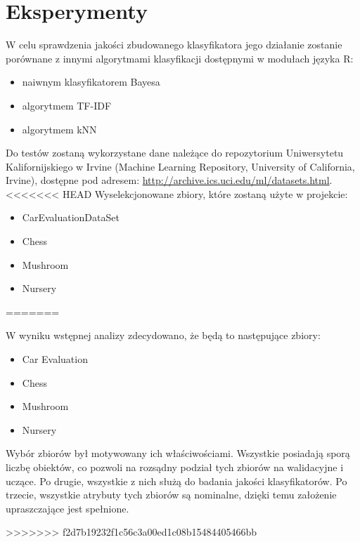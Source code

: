 \documentclass[paper=a4, fontsize=11pt]{scrartcl} %
\numberwithin{equation}{section} %
\numberwithin{figure}{section} %
\numberwithin{table}{section} %
\begin{document}
\section{Eksperymenty}   
W celu sprawdzenia jakości zbudowanego klasyfikatora jego działanie zostanie porównane z innymi algorytmami klasyfikacji dostępnymi w modułach języka R: \\
\begin{itemize}
\item naiwnym klasyfikatorem Bayesa
\item algorytmem TF-IDF
\item algorytmem kNN
\end{itemize}
Do testów zostaną wykorzystane dane należące do repozytorium Uniwersytetu Kalifornijskiego w Irvine (Machine Learning Repository, University of California, Irvine), dostępne pod adresem: \url{http://archive.ics.uci.edu/ml/datasets.html}.
<<<<<<< HEAD
Wyselekcjonowane zbiory, które zostaną użyte w projekcie:
\begin{itemize}
\item CarEvaluationDataSet
\item Chess
\item Mushroom
\item Nursery
\end{itemize}
=======

W wyniku wstępnej analizy zdecydowano, że będą to następujące zbiory:
\begin{itemize}
 \item Car Evaluation
 \item Chess
 \item Mushroom
 \item Nursery
\end{itemize}

Wybór zbiorów był motywowany ich właściwościami. Wszystkie posiadają sporą liczbę obiektów, co pozwoli na rozsądny podział tych zbiorów na walidacyjne i uczące.
Po drugie, wszystkie z nich służą do badania jakości klasyfikatorów. Po trzecie, wszystkie atrybuty tych zbiorów są nominalne, dzięki temu założenie upraszczające jest spełnione.

>>>>>>> f2d7b19232f1c56c3a00ed1c08b15484405466bb

\nocite{Bayesian_Network_Classifiers}

\nocite{*}

 
\end{document}
